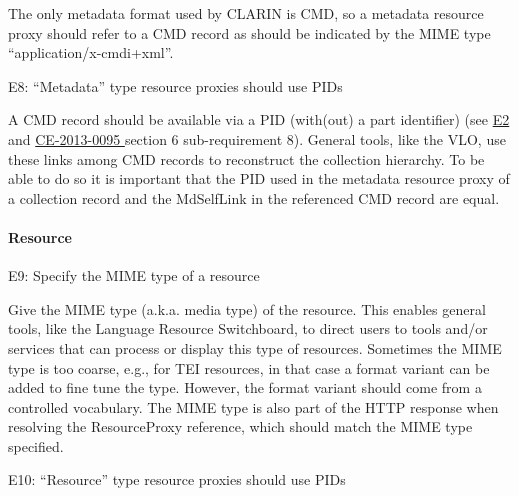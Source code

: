 
The only metadata format used by CLARIN is CMD, so a metadata resource proxy should refer to a CMD record as should be indicated by the MIME type ``application/x-cmdi+xml''.

\label{e8}
E8: ``Metadata'' type resource proxies should use PIDs


A CMD record should be available via a PID (with(out) a part identifier) (see \hyperref[e2]{E2} and \href{http://hdl.handle.net/1839/00-DOCS.CLARIN.EU-78}{CE-2013-0095 \cite{ce20130095}} section 6 sub-requirement 8). General tools, like the VLO, use these links among CMD records to reconstruct the collection hierarchy. To be able to do so it is important that the PID used in the metadata resource proxy of a collection record and the MdSelfLink in the referenced CMD record are equal.

\paragraph{Resource}\label{resource}



E9: Specify the MIME type of a resource


Give the MIME type (a.k.a. media type) of the resource. This enables general tools, like the Language Resource Switchboard, to direct users to tools and/or services that can process or display this type of resources. Sometimes the MIME type is too coarse, e.g., for TEI resources, in that case a format variant can be added to fine tune the type. However, the format variant should come from a controlled vocabulary. The MIME type is also part of the HTTP response when resolving the ResourceProxy reference, which should match the MIME type specified.

E10: ``Resource'' type resource proxies should use PIDs

